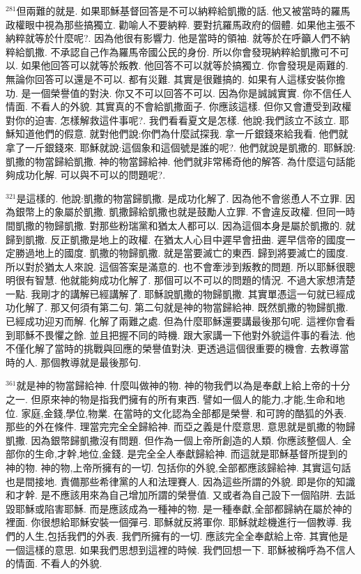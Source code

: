 \documentclass{book}
\begin{document}
$^{281}$但兩難的就是.
如果耶穌基督回答是不可以納粹給凱撒的話.
他又被當時的羅馬政權眼中視為那些搞獨立.
勸喻人不要納粹.
要對抗羅馬政府的個體.
如果他主張不納粹就等於什麼呢?.
因為他很有影響力.
他是當時的領袖.
就等於在呼籲人們不納粹給凱撒.
不承認自己作為羅馬帝國公民的身份.
所以你會發現納粹給凱撒可不可以.
如果他回答可以就等於叛教.
他回答不可以就等於搞獨立.
你會發現是兩難的.
無論你回答可以還是不可以.
都有災難.
其實是很難搞的.
如果有人這樣安裝你擔功.
是一個榮譽值的對決.
你又不可以回答不可以.
因為你是誠誠實實.
你不信任人情面.
不看人的外貌.
其實真的不會給凱撒面子.
你應該這樣.
但你又會遭受到政權對你的迫害.
怎樣解救這件事呢?.
我們看看夏文是怎樣.
他說:我們該立不該立.
耶穌知道他們的假意.
就對他們說:你們為什麼試探我.
拿一斤銀錢來給我看.
他們就拿了一斤銀錢來.
耶穌就說:這個象和這個號是誰的呢?.
他們就說是凱撒的.
耶穌說:凱撒的物當歸給凱撒.
神的物當歸給神.
他們就非常稀奇他的解答.
為什麼這句話能夠成功化解.
可以與不可以的問題呢?.

$^{321}$是這樣的.
他說:凱撒的物當歸凱撒.
是成功化解了.
因為他不會慫恿人不立罪.
因為銀幣上的象屬於凱撒.
凱撒歸給凱撒也就是鼓勵人立罪.
不會違反政權.
但同一時間凱撒的物歸凱撒.
對那些粉瑞黨和猶太人都可以.
因為這個本身是屬於凱撒的.
就歸到凱撒.
反正凱撒是地上的政權.
在猶太人心目中遲早會扭曲.
遲早信帝的國度一定勝過地上的國度.
凱撒的物歸凱撒.
就是當要滅亡的東西.
歸到將要滅亡的國度.
所以對於猶太人來說.
這個答案是滿意的.
也不會牽涉到叛教的問題.
所以耶穌很聰明很有智慧.
他就能夠成功化解了.
那個可以不可以的問題的情況.
不過大家想清楚一點.
我剛才的講解已經講解了.
耶穌說凱撒的物歸凱撒.
其實單憑這一句就已經成功化解了.
那又何須有第二句.
第二句就是神的物當歸給神.
既然凱撒的物歸凱撒.
已經成功迎刃而解.
化解了兩難之處.
但為什麼耶穌還要講最後那句呢.
這裡你會看到耶穌不畏懼之餘.
並且把握不同的時機.
跟大家講一下他對外貌這件事的看法.
他不僅化解了當時的挑戰與回應的榮譽值對決.
更透過這個很重要的機會.
去教導當時的人.
那個教導就是最後那句.

$^{361}$就是神的物當歸給神.
什麼叫做神的物.
神的物我們以為是奉獻上給上帝的十分之一.
但原來神的物是指我們擁有的所有東西.
譬如一個人的能力,才能,生命和地位.
家庭,金錢,學位,物業.
在當時的文化認為全部都是榮譽.
和可誇的酷狐的外表.
那些的外在條件.
理當完完全全歸給神.
而亞之義是什麼意思.
意思就是凱撒的物歸凱撒.
因為銀幣歸凱撒沒有問題.
但作為一個上帝所創造的人類.
你應該整個人.
全部你的生命,才幹,地位,金錢.
是完全全人奉獻歸給神.
而這就是耶穌基督所提到的神的物.
神的物,上帝所擁有的一切.
包括你的外貌,全部都應該歸給神.
其實這句話也是間接地.
責備那些希律黨的人和法理賽人.
因為這些所謂的外貌.
即是你的知識和才幹.
是不應該用來為自己增加所謂的榮譽值.
又或者為自己設下一個陷阱.
去詆毀耶穌或陷害耶穌.
而是應該成為一種神的物.
是一種奉獻,全部都歸納在屬於神的裡面.
你很想給耶穌安裝一個彈弓.
耶穌就反將軍你.
耶穌就趁機進行一個教導.
我們的人生,包括我們的外表.
我們所擁有的一切.
應該完全全奉獻給上帝.
其實他是一個這樣的意思.
如果我們思想到這裡的時候.
我們回想一下.
耶穌被稱呼為不信人的情面.
不看人的外貌.
\end{document}
